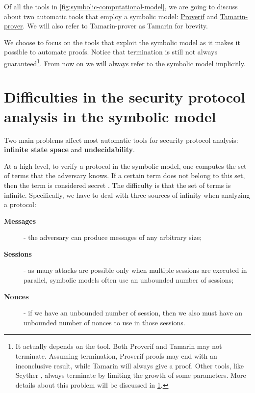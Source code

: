 Of all the tools in \cref{fig:symbolic-computational-model}, we are going to discuss about two automatic tools that employ a symbolic model: \href{https://prosecco.gforge.inria.fr/personal/bblanche/proverif/}{Proverif} and \href{https://tamarin-prover.github.io/}{Tamarin-prover}. We will also refer to Tamarin-prover as Tamarin for brevity. 

We choose to focus on the tools that exploit the symbolic model as it makes it possible to automate proofs. Notice that termination is still not always guaranteed\footnote{It actually depends on the tool. Both Proverif and Tamarin may not terminate. Assuming termination, Proverif proofs may end with an inconclusive result, while Tamarin will always give a proof. Other tools, like Scyther \cite{Scyther}, always terminate by limiting the growth of some parameters. More details about this problem will be discussed in \cref{sec:difficulties-analysis-symbolic}.}. From now on we will always refer to the symbolic model implicitly.

\section{Difficulties in the security protocol analysis in the symbolic model}
\label{sec:difficulties-analysis-symbolic}
Two main problems affect most automatic tools for security protocol analysis: \textbf{infinite state space} and \textbf{undecidability}.

At a high level, to verify a protocol in the symbolic model, one computes the set of terms that the adversary knows. If a certain term does not belong to this set, then the term is considered secret \cite{SymbolicVerificationBlanchet}. The difficulty is that the set of terms is infinite. Specifically, we have to deal with three sources of infinity when analyzing a protocol:
\begin{description}
    \item[\textbf{Messages}] - the adversary can produce messages of any arbitrary size;
    \item[\textbf{Sessions}] - as many attacks are possible only when multiple sessions are executed in parallel, symbolic models often use an unbounded number of sessions;
    \item[\textbf{Nonces}] - if we have an unbounded number of session, then we also must have an unbounded number of nonces to use in those sessions.
\end{description}

